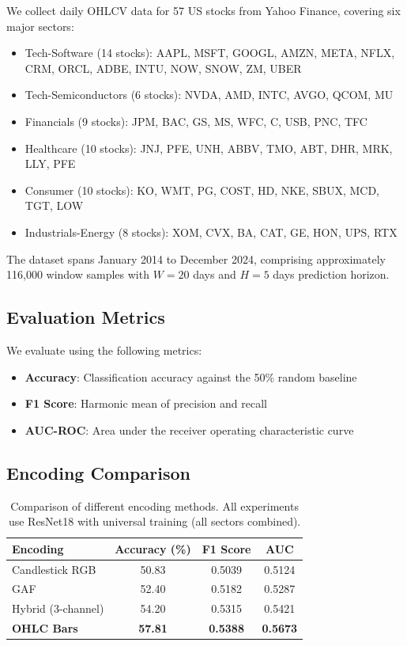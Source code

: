\documentclass[runningheads]{llncs}
\begin{document}
We collect daily OHLCV data for 57 US stocks from Yahoo Finance, covering six major sectors:

\begin{itemize}
    \item Tech-Software (14 stocks): AAPL, MSFT, GOOGL, AMZN, META, NFLX, CRM, ORCL, ADBE, INTU, NOW, SNOW, ZM, UBER
    \item Tech-Semiconductors (6 stocks): NVDA, AMD, INTC, AVGO, QCOM, MU
    \item Financials (9 stocks): JPM, BAC, GS, MS, WFC, C, USB, PNC, TFC
    \item Healthcare (10 stocks): JNJ, PFE, UNH, ABBV, TMO, ABT, DHR, MRK, LLY, PFE
    \item Consumer (10 stocks): KO, WMT, PG, COST, HD, NKE, SBUX, MCD, TGT, LOW
    \item Industrials-Energy (8 stocks): XOM, CVX, BA, CAT, GE, HON, UPS, RTX
\end{itemize}

The dataset spans January 2014 to December 2024, comprising approximately 116,000 window samples with $W=20$ days and $H=5$ days prediction horizon.

\subsection{Evaluation Metrics}
\label{sec:metrics}

We evaluate using the following metrics:
\begin{itemize}
    \item \textbf{Accuracy}: Classification accuracy against the 50\% random baseline
    \item \textbf{F1 Score}: Harmonic mean of precision and recall
    \item \textbf{AUC-ROC}: Area under the receiver operating characteristic curve
\end{itemize}

\subsection{Encoding Comparison}
\label{sec:encoding_exp}

\begin{table}[t]
\centering
\caption{Comparison of different encoding methods. All experiments use ResNet18 with universal training (all sectors combined).}
\label{tab:encoding}
\begin{tabular}{@{}lccc@{}}
\toprule
\textbf{Encoding} & \textbf{Accuracy (\%)} & \textbf{F1 Score} & \textbf{AUC} \\
\midrule
Candlestick RGB & 50.83 & 0.5039 & 0.5124 \\
GAF & 52.40 & 0.5182 & 0.5287 \\
Hybrid (3-channel) & 54.20 & 0.5315 & 0.5421 \\
\textbf{OHLC Bars}~\cite{Xiu21} & \textbf{57.81} & \textbf{0.5388} & \textbf{0.5673} \\
\bottomrule
\end{tabular}
\end{table}
\end{document}
